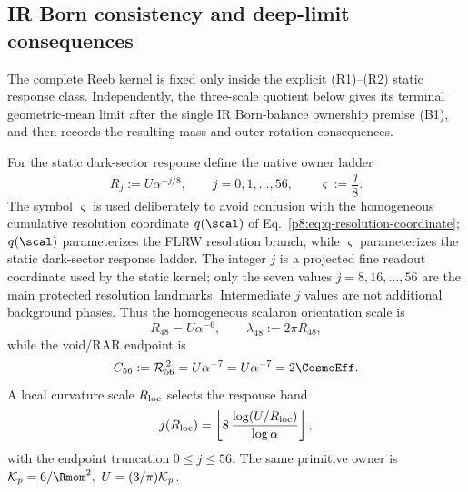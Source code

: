 \documentclass[12pt,a4paper]{article}
\begin{document}
\subsection{IR Born consistency and deep-limit consequences}
\label{p8:sec:ir-born-deep-consistency}
The complete Reeb kernel is fixed only inside the explicit (R1)--(R2) static response class.  Independently, the three-scale quotient below gives its terminal geometric-mean limit after the single IR Born-balance ownership premise (B1), and then records the resulting mass and outer-rotation consequences.

\begin{definition}
\label{p8:def:dark-response-ladder}
For the static dark-sector response define the native owner ladder
\begin{equation}
\label{p8:eq:dark-response-ladder}
R_j:=U\alpha^{-j/8},
\qquad j=0,1,\ldots,56,
\qquad \varsigma:=\frac{j}{8}.
\end{equation}
The symbol \(\varsigma\) is used deliberately to avoid confusion with the
homogeneous cumulative resolution coordinate \(q(\scal)\) of
Eq.~\eqref{p8:eq:q-resolution-coordinate}; \(q(\scal)\) parameterizes the
FLRW resolution branch, while \(\varsigma\) parameterizes the static
dark-sector response ladder.  The integer \(j\) is a projected fine readout
coordinate used by the static kernel; only the seven values
\(j=8,16,\ldots,56\) are the main protected resolution landmarks.
Intermediate \(j\) values are not additional background phases.  Thus the
homogeneous scalaron orientation scale is
\begin{equation}
R_{48}=U\alpha^{-6},
\qquad
\lambda_{48}:=2\pi R_{48},
\end{equation}
while the void/RAR endpoint is
\begin{equation}
C_{56}:=\mathcal R_{56}^{\,2}=U\alpha^{-7}
=U\alpha^{-7}=2\CosmoEff.
\end{equation}
A local curvature scale \(R_{\rm loc}\) selects the response band
\begin{equation}
\label{p8:eq:j-selector}
j(R_{\rm loc})
=\left\lfloor
8\,\frac{\log(U/R_{\rm loc})}{\log\alpha}
\right\rfloor,
\end{equation}
with the endpoint truncation \(0\le j\le56\).  The same primitive owner is \(\mathcal K_p=6/\Rmom^2,\ U=(3/\pi)\mathcal K_p\).
\end{definition}
\end{document}
